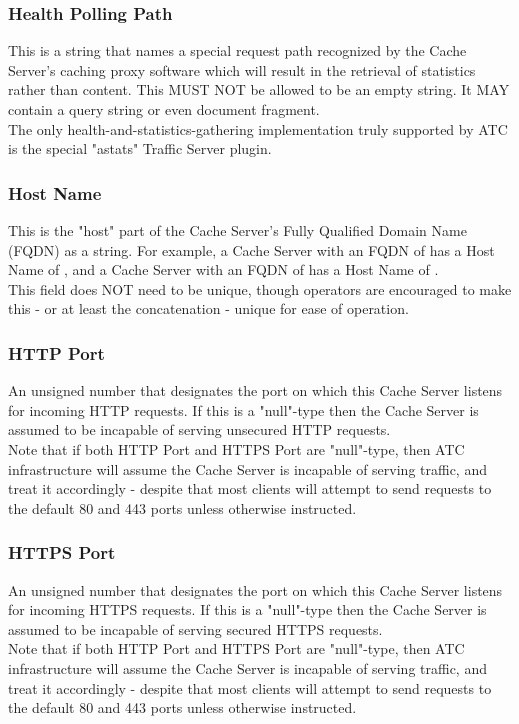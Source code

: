 \subsubsection{Health Polling Path}
This is a string that names a special request path recognized by the Cache
Server's caching proxy software which will result in the retrieval of statistics
rather than content. This MUST NOT be allowed to be an empty string. It MAY
contain a query string or even document fragment.\\
The only health-and-statistics-gathering implementation truly supported by ATC
is the special "astats" Traffic Server plugin.

\subsubsection{Host Name}
This is the "host" part of the Cache Server's Fully Qualified Domain Name (FQDN)
as a string. For example, a Cache Server with an FQDN of  has a
Host Name of , and a Cache Server with an FQDN of
 has a Host Name of .\\
This field does NOT need to be unique, though operators are encouraged to make
this - or at least the concatenation  - unique
for ease of operation.

\subsubsection{HTTP Port}
An unsigned number that designates the port on which this Cache Server listens
for incoming HTTP requests. If this is a "null"-type then the Cache Server is
assumed to be incapable of serving unsecured HTTP requests.\\
Note that if both HTTP Port and HTTPS Port are "null"-type, then ATC
infrastructure will assume the Cache Server is incapable of serving traffic, and
treat it accordingly - despite that most clients will attempt to send requests
to the default 80 and 443 ports unless otherwise instructed.

\subsubsection{HTTPS Port}
An unsigned number that designates the port on which this Cache Server listens
for incoming HTTPS requests. If this is a "null"-type then the Cache Server is
assumed to be incapable of serving secured HTTPS requests.\\
Note that if both HTTP Port and HTTPS Port are "null"-type, then ATC
infrastructure will assume the Cache Server is incapable of serving traffic, and
treat it accordingly - despite that most clients will attempt to send requests
to the default 80 and 443 ports unless otherwise instructed.


